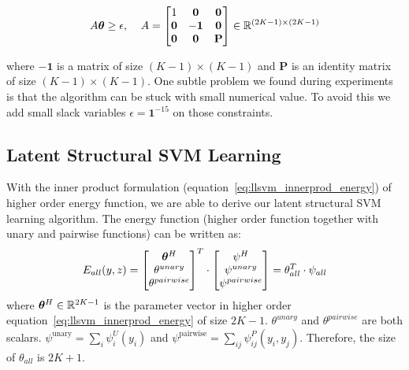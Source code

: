 \begin{align}
  \label{eq:concave_constraint}
  A{\bm{\theta}}\geq\epsilon \text{,\;~~~} A=
                  \begin{bmatrix}
                    1 & \mathbf{0} & \mathbf{0}\\
                    \mathbf{0} & -\mathbf{1} & \mathbf{0}\\
                    \mathbf{0} & \mathbf{0} & \mathbf{P}
                  \end{bmatrix}\in \mathbb{R}^{(2K-1)\times(2K-1)}
\end{align}

\noindent where $-\mathbf{1}$ is a matrix of size $(K-1)\times(K-1)$ and
$\mathbf{P}$ is an identity matrix of size $(K-1)\times(K-1)$.
One subtle problem we found during experiments is that the
algorithm can be stuck with small numerical value. To avoid this
we add small slack variables $\epsilon=\mathbf{1}^{-15}$ on 
those constraints.

\subsection{Latent Structural SVM Learning}
\label{sec:mrflssvm_learning_algo}

With the inner product formulation
(equation~\eqref{eq:llsvm_innerprod_energy}) of higher order
energy function, we are able to derive our latent
structural SVM learning algorithm. The energy function (higher
order function together with unary and pairwise functions) can be
written as:
\begin{equation}
  E_{all}(y,z) = \begin{bmatrix}
    {\bm{\theta}}^H\\
    \theta^{unary}\\
    \theta^{pairwise}
  \end{bmatrix}^T 
  \cdot \begin{bmatrix}
    \psi^H\\
    \psi^{unary}\\
    \psi^{pairwise}
  \end{bmatrix}=\theta_{all}^T\cdot\psi_{all}
\end{equation}
where ${\bm{\theta}}^H\in {\mathbb{R}}^{2K-1}$ is the parameter vector in higher
order equation~\eqref{eq:llsvm_innerprod_energy} of size $2K-1$.
$\theta^{unary}$ and $\theta^{pairwise}$ are both scalars.
$\psi^\textrm{unary} = \sum_i \psi^U_i\!(y_i)$ and
$\psi^\textrm{pairwise} = \sum_{ij} \psi^P_{ij}(y_i, y_j)$.
Therefore, the size of $\theta_{all}$ is $2K+1$.

